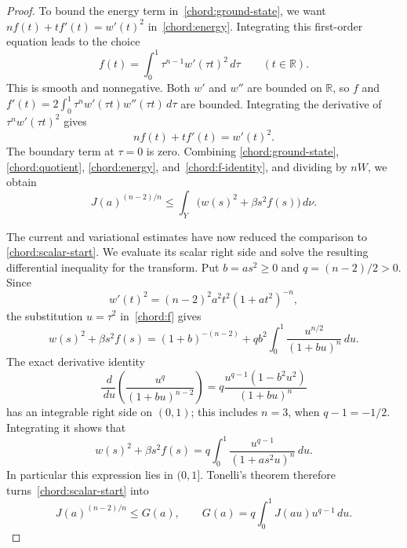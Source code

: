 \documentclass[11pt]{article}
\numberwithin{equation}{section}
\theoremstyle{definition}
\theoremstyle{remark}
\begin{document}
\begin{proof}
To bound the energy term in~\eqref{chord:ground-state}, we want
$nf(t)+tf'(t)=w'(t)^2$ in~\eqref{chord:energy}. Integrating this
first-order equation leads to the choice
\begin{equation}\label{chord:f}
 f(t)=\int_0^1\tau^{n-1}w'(\tau t)^2\,d\tau
                   \qquad(t\in\mathbb R).
\end{equation}
This is smooth and nonnegative. Both $w'$ and $w''$ are bounded
on $\mathbb R$, so $f$ and
$f'(t)=2\int_0^1\tau^nw'(\tau t)w''(\tau t)\,d\tau$
are bounded. Integrating the derivative of
$\tau^nw'(\tau t)^2$ gives
\begin{equation}\label{chord:f-identity}
 nf(t)+tf'(t)=w'(t)^2.
\end{equation}
The boundary term at $\tau=0$ is zero. Combining
\eqref{chord:ground-state}, \eqref{chord:quotient},
\eqref{chord:energy}, and~\eqref{chord:f-identity}, and dividing
by $nW$, we obtain
\begin{equation}\label{chord:scalar-start}
 J(a)^{(n-2)/n}
          \le\int_Y\bigl(w(s)^2+\beta s^2f(s)\bigr)\,d\nu.
\end{equation}

The current and variational estimates have now reduced the comparison
to \eqref{chord:scalar-start}. We evaluate its scalar right side and
solve the resulting differential inequality for the transform. Put
$b=as^2\ge0$ and $q=(n-2)/2>0$. Since
\[
 w'(t)^2=(n-2)^2a^2t^2(1+at^2)^{-n},
\]
the substitution $u=\tau^2$ in~\eqref{chord:f} gives
\[
 w(s)^2+\beta s^2f(s)
 =(1+b)^{-(n-2)}
             +q b^2\int_0^1\frac{u^{n/2}}{(1+bu)^n}\,d u.
\]
The exact derivative identity
\[
 \frac{\,d}{\,d u}\left(\frac{u^q}{(1+bu)^{n-2}}\right)
       =q\frac{u^{q-1}(1-b^2u^2)}{(1+bu)^n}
\]
has an integrable right side on $(0,1)$; this includes $n=3$,
when $q-1=-1/2$. Integrating it shows that
\begin{equation}\label{chord:scalar-identity}
 w(s)^2+\beta s^2f(s)
       =q\int_0^1\frac{u^{q-1}}{(1+as^2u)^n}\,d u.
\end{equation}
In particular this expression lies in $(0,1]$. Tonelli's theorem
therefore turns~\eqref{chord:scalar-start} into
\begin{equation}\label{chord:J-G}
 J(a)^{(n-2)/n}\le G(a),\qquad
 G(a)=q\int_0^1J(au)u^{q-1}\,d u.
\end{equation}


\end{proof}
\end{document}
